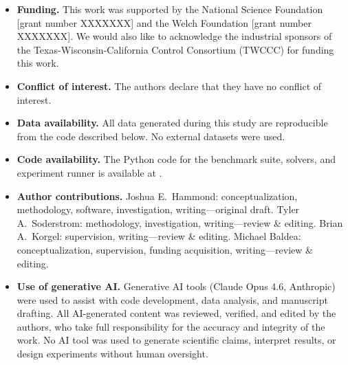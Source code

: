 \documentclass[12pt,a4paper]{article}%
\theoremstyle{plain}%
\theoremstyle{remark}%
\theoremstyle{definition}%
\begin{document}
\begin{itemize}
\item \textbf{Funding.} This work was supported by the National Science Foundation [grant number XXXXXXX] and the Welch Foundation [grant number XXXXXXX]. We would also like to acknowledge the industrial sponsors of the Texas-Wisconsin-California Control Consortium (TWCCC) for funding this work.

\item \textbf{Conflict of interest.} The authors declare that they have no conflict of interest.

\item \textbf{Data availability.} All data generated during this study are reproducible from the code described below. No external datasets were used.

\item \textbf{Code availability.} The Python code for the benchmark suite, solvers, and experiment runner is available at .

\item \textbf{Author contributions.} Joshua E.\ Hammond: conceptualization, methodology, software, investigation, writing---original draft. Tyler A.\ Soderstrom: methodology, investigation, writing---review \& editing. Brian A.\ Korgel: supervision, writing---review \& editing. Michael Baldea: conceptualization, supervision, funding acquisition, writing---review \& editing.

\item \textbf{Use of generative AI.} Generative AI tools (Claude Opus 4.6, Anthropic) were used to assist with code development, data analysis, and manuscript drafting. All AI-generated content was reviewed, verified, and edited by the authors, who take full responsibility for the accuracy and integrity of the work. No AI tool was used to generate scientific claims, interpret results, or design experiments without human oversight.
\end{itemize}
\end{document}
